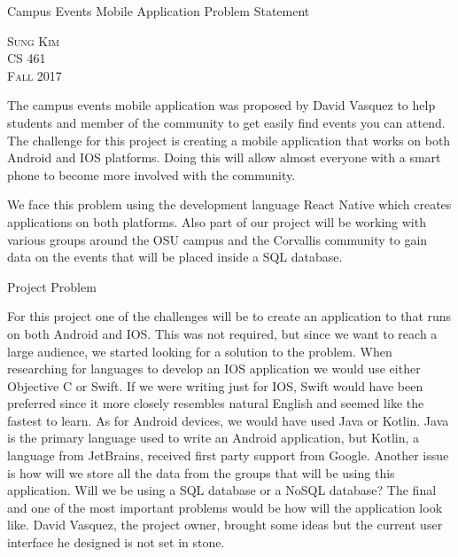 \documentclass[10pt]{article}
\begin{document}
\newcommand\tab[1][1cm]{\hspace*{#1}}
\begin{titlepage}

	\centering
	\scshape
	\vspace*{\baselineskip}
	

	\vspace{0.75\baselineskip} 
	
	{\LARGE Campus Events Mobile Application Problem Statement} 
	
	\vspace{6.25\baselineskip}
	
	{\scshape\Large Sung Kim \\ CS 461 \\ Fall 2017 \\} 
	
	\vspace{5\baselineskip} 
	
	\tab The campus events mobile application was proposed by David Vasquez to help students and member of the community to get easily find events you can attend. The challenge for this project is creating a mobile application that works on both Android and IOS platforms. Doing this will allow almost everyone with a smart phone to become more involved with the community.
	
	\vspace{1\baselineskip}
	
	\tab We face this problem using the development language React Native which creates applications on both platforms. Also part of our project will be working with various groups around the OSU campus and the Corvallis community to gain data on the events that will be placed inside a SQL database.
	\vfill 
	
	\vspace{0.3\baselineskip} 
	
\end{titlepage}

\centerline{Project Problem}
	\vspace{1\baselineskip}
	
	\tab For this project one of the challenges will be to create an application to that runs on both Android and IOS. This was not required, but since we want to reach a large audience, we started looking for a solution to the problem. When researching for languages to develop an IOS application we would use either Objective C or Swift. If we were writing just for IOS, Swift would have been preferred since it more closely resembles natural English and seemed like the fastest to learn. As for Android devices, we would have used Java or Kotlin. Java is the primary language used to write an Android application, but Kotlin, a language from JetBrains, received first party support from Google. Another issue is how will we store all the data from the groups that will be using this application. Will we be using a SQL database or a NoSQL database? The final and one of the most important problems would be how will the application look like. David Vasquez, the project owner, brought some ideas but the current user interface he designed is not set in stone. 
\end{document}

